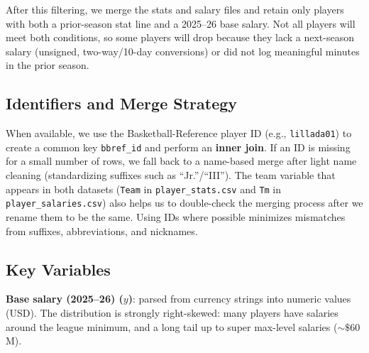 \documentclass{article}
\theoremstyle{plain}
\theoremstyle{definition}
\theoremstyle{remark}
\begin{document}
After this filtering, we merge the stats and salary files and retain only players with both a prior-season stat line and a 2025--26 base salary. Not all players will meet both conditions, so some players will drop because they lack a next-season salary (unsigned, two-way/10-day conversions) or did not log meaningful minutes in the prior season.

\subsection*{Identifiers and Merge Strategy}
When available, we use the Basketball-Reference player ID (e.g., \texttt{lillada01}) to create a common key \texttt{bbref\_id} and perform an \textbf{inner join}. If an ID is missing for a small number of rows, we fall back to a name-based merge after light name cleaning (standardizing suffixes such as ``Jr.''/``III'').  The team variable that appears in both datasets (\texttt{Team} in \texttt{player\_stats.csv} and \texttt{Tm} in \texttt{player\_salaries.csv}) also helps us to double-check the merging process after we rename them to be the same. 
Using IDs where possible minimizes mismatches from suffixes, abbreviations, and nicknames.

\subsection*{Key Variables}
\textbf{Base salary (2025--26) ($y$)}: parsed from currency strings into numeric values (USD). The distribution is strongly right-skewed: many players have salaries around the league minimum, and a long tail up to super max-level salaries ($\sim\$60$M).
\end{document}

